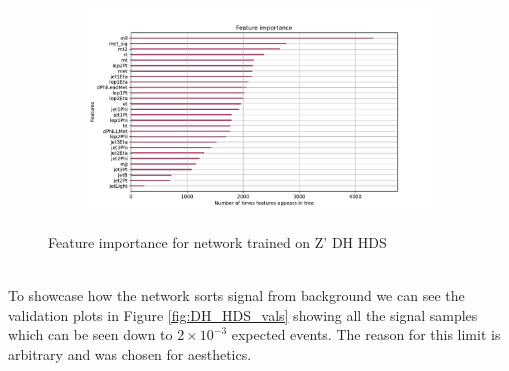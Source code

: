 \documentclass[12pt, a4paper]{book}
\begin{document}
\begin{figure}[!ht]
\begin{subfigure}[b]{0.7\textwidth}
      \end{subfigure}
      \hfill
      \begin{subfigure}[b]{0.7\textwidth}
         \centering
         \includegraphics[width=1\textwidth]{XGBoost/DH_HDS/feature_importance/weight.pdf}
      \end{subfigure}
   \caption{Feature importance for network trained on Z' DH HDS}\label{fig:DH_HDS_feat}
\end{figure}
\\To showcase how the network sorts signal from background we can see the validation plots in Figure \ref{fig:DH_HDS_vals} showing all the signal samples which can be seen down to $2\times10^{-3}$ expected events. The reason for this limit is arbitrary and was chosen for aesthetics.\\
\end{document}
